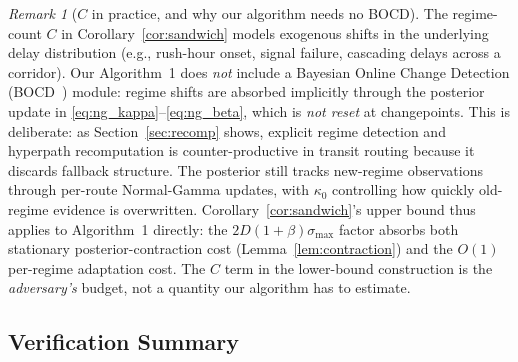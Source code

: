 \documentclass[11pt]{article}
\theoremstyle{definition}
\theoremstyle{remark}
\newtheorem{remark}{Remark}
\begin{document}
\begin{remark}[$C$ in practice, and why our algorithm needs no BOCD]
\label{rem:no-bocd}
The regime-count $C$ in Corollary~\ref{cor:sandwich} models exogenous
shifts in the underlying delay distribution (e.g., rush-hour onset,
signal failure, cascading delays across a corridor). Our Algorithm~1
does \emph{not} include a Bayesian Online Change Detection
(BOCD~\cite{adams2007}) module: regime shifts are absorbed
implicitly through the posterior update in
\eqref{eq:ng_kappa}--\eqref{eq:ng_beta}, which is \emph{not reset} at
changepoints. This is deliberate: as Section~\ref{sec:recomp} shows,
explicit regime detection and hyperpath recomputation is counter-productive
in transit routing because it discards fallback structure.
The posterior still tracks new-regime observations through
per-route Normal-Gamma updates, with $\kappa_0$ controlling how quickly
old-regime evidence is overwritten. Corollary~\ref{cor:sandwich}'s
upper bound thus applies to Algorithm~1 directly: the
$2D(1{+}\beta)\sigma_{\max}$ factor absorbs both stationary
posterior-contraction cost (Lemma~\ref{lem:contraction}) and the
$O(1)$ per-regime adaptation cost. The $C$ term in the lower-bound
construction is the \emph{adversary's} budget, not a quantity our
algorithm has to estimate.
\end{remark}

\subsection{Verification Summary}
\end{document}
